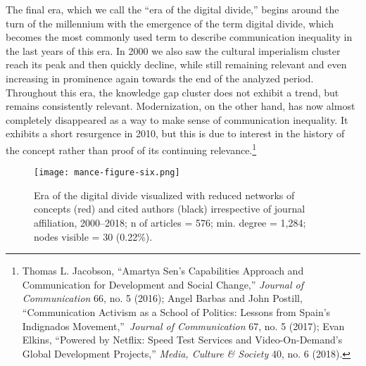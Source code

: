 \documentclass{tufte-handout}
\begin{document}
The final era, which we call the ``era of the digital divide,'' begins
around the turn of the millennium with the emergence of the term digital
divide, which becomes the most commonly used term to describe
communication inequality in the last years of this era. In 2000 we also
saw the cultural imperialism cluster reach its peak and then quickly
decline, while still remaining relevant and even increasing in
prominence again towards the end of the analyzed period. Throughout this
era, the knowledge gap cluster does not exhibit a trend, but remains
consistently relevant. Modernization, on the other hand, has now almost
completely disappeared as a way to make sense of communication
inequality. It exhibits a short resurgence in 2010, but this is due to
interest in the history of the concept rather than proof of its
continuing relevance.\footnote{Thomas L. Jacobson, ``Amartya Sen's
  Capabilities Approach and Communication for Development and Social
  Change,'' \emph{Journal of Communication} 66, no. 5 (2016); Angel
  Barbas and John Postill, ``Communication Activism as a School of
  Politics: Lessons from Spain's Indignados Movement,''~\emph{Journal of
  Communication} 67, no. 5 (2017); Evan Elkins, ``Powered by Netflix:
  Speed Test Services and Video-On-Demand's Global Development
  Projects,'' \emph{Media, Culture \& Society} 40, no. 6 (2018).}
  
\begin{figure}
    \centering
    \texttt{[image: mance-figure-six.png]}
    \caption{Era of the digital divide visualized with reduced networks of
concepts (red) and cited authors (black) irrespective of journal
affiliation, 2000--2018; n of articles = 576; min. degree = 1,284; nodes
visible = 30 (0.22\%).}
    \label{fig:six}
\end{figure}
\end{document}
